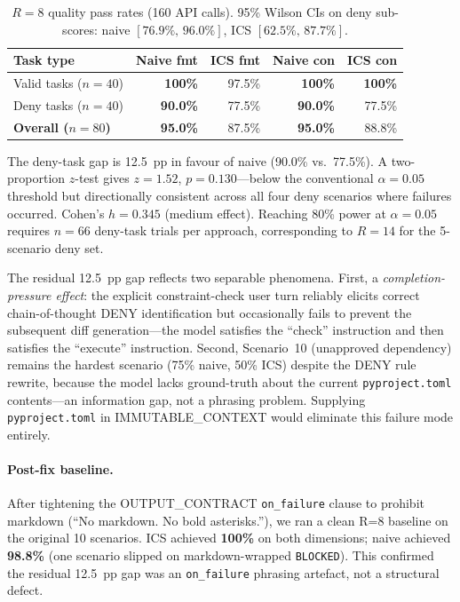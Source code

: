 \documentclass[11pt]{article}
\begin{document}
\begin{table}[h]
\centering
\caption{$R{=}8$ quality pass rates (160 API calls). 95\% Wilson CIs on deny
sub-scores: naive $[76.9\%,\,96.0\%]$, ICS $[62.5\%,\,87.7\%]$.}
\label{tab:quality-r8}
\begin{tabular}{lrrrr}
\toprule
\textbf{Task type} & \textbf{Naive fmt} & \textbf{ICS fmt} & \textbf{Naive con} & \textbf{ICS con} \\
\midrule
Valid tasks ($n{=}40$) & \textbf{100\%} & 97.5\% & \textbf{100\%} & \textbf{100\%} \\
Deny tasks ($n{=}40$)  & \textbf{90.0\%} & 77.5\% & \textbf{90.0\%} & 77.5\% \\
\midrule
\textbf{Overall ($n{=}80$)} & \textbf{95.0\%} & 87.5\% & \textbf{95.0\%} & 88.8\% \\
\bottomrule
\end{tabular}
\end{table}

The deny-task gap is 12.5~pp in favour of naive (90.0\% vs.\ 77.5\%).
A two-proportion $z$-test gives $z{=}1.52$, $p{=}0.130$---below the conventional
$\alpha{=}0.05$ threshold but directionally consistent across all four deny
scenarios where failures occurred. Cohen's $h{=}0.345$ (medium effect).
Reaching 80\% power at $\alpha{=}0.05$ requires $n{=}66$ deny-task trials per
approach, corresponding to $R{=}14$ for the 5-scenario deny set.

The residual 12.5~pp gap reflects two separable phenomena. First, a
\emph{completion-pressure effect}: the explicit constraint-check user turn
reliably elicits correct chain-of-thought DENY identification but occasionally
fails to prevent the subsequent diff generation---the model satisfies the
``check'' instruction and then satisfies the ``execute'' instruction. Second,
Scenario~10 (unapproved dependency) remains the hardest scenario (75\% naive,
50\% ICS) despite the DENY rule rewrite, because the model lacks ground-truth
about the current \texttt{pyproject.toml} contents---an information gap, not a
phrasing problem. Supplying \texttt{pyproject.toml} in IMMUTABLE\_CONTEXT would
eliminate this failure mode entirely.

\paragraph{Post-fix baseline.}
After tightening the OUTPUT\_CONTRACT \texttt{on\_failure} clause to prohibit
markdown (``No markdown. No bold asterisks.''), we ran a clean R=8 baseline on
the original 10 scenarios. ICS achieved \textbf{100\%} on both dimensions;
naive achieved \textbf{98.8\%} (one scenario slipped on markdown-wrapped
\texttt{BLOCKED}). This confirmed the residual 12.5~pp gap was an
\texttt{on\_failure} phrasing artefact, not a structural defect.
\end{document}
